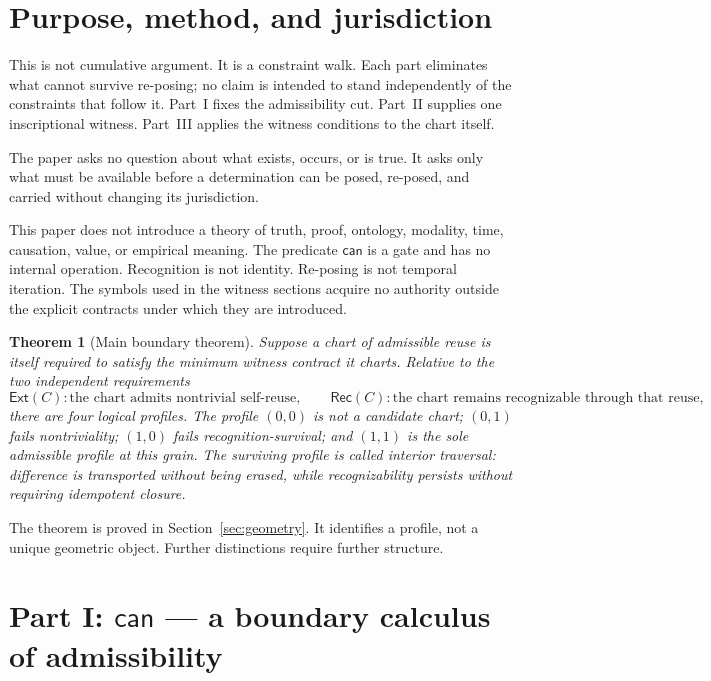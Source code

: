 \documentclass[11pt,letterpaper]{article}
\theoremstyle{constraintstyle}
\newtheorem{theorem}{Theorem}[section]
\newcommand{\Can}{\mathsf{can}}
\newcommand{\Ext}{\mathsf{Ext}}
\newcommand{\Rec}{\mathsf{Rec}}
\begin{document}
\tableofcontents
\clearpage

\section{Purpose, method, and jurisdiction}

This is not cumulative argument.  It is a constraint walk.  Each part eliminates what cannot survive re-posing; no claim is intended to stand independently of the constraints that follow it.  Part~I fixes the admissibility cut.  Part~II supplies one inscriptional witness.  Part~III applies the witness conditions to the chart itself.

The paper asks no question about what exists, occurs, or is true.  It asks only what must be available before a determination can be posed, re-posed, and carried without changing its jurisdiction.

\begin{boundarybox}
This paper does not introduce a theory of truth, proof, ontology, modality, time, causation, value, or empirical meaning.  The predicate $\Can$ is a gate and has no internal operation.  Recognition is not identity.  Re-posing is not temporal iteration.  The symbols used in the witness sections acquire no authority outside the explicit contracts under which they are introduced.
\end{boundarybox}

\begin{theorem}[Main boundary theorem]\label{thm:main}
Suppose a chart of admissible reuse is itself required to satisfy the minimum witness contract it charts.  Relative to the two independent requirements
\[
\Ext(C): \text{the chart admits nontrivial self-reuse},
\qquad
\Rec(C): \text{the chart remains recognizable through that reuse},
\]
there are four logical profiles.  The profile $(0,0)$ is not a candidate chart; $(0,1)$ fails nontriviality; $(1,0)$ fails recognition-survival; and $(1,1)$ is the sole admissible profile at this grain.  The surviving profile is called \emph{interior traversal}: difference is transported without being erased, while recognizability persists without requiring idempotent closure.
\end{theorem}

The theorem is proved in Section~\ref{sec:geometry}.  It identifies a profile, not a unique geometric object.  Further distinctions require further structure.

\section{Part I: \texorpdfstring{$\Can$}{can} --- a boundary calculus of admissibility}\label{sec:can}
\end{document}

